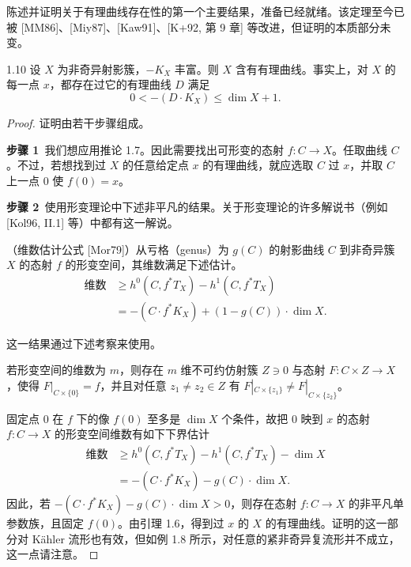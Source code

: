 陈述并证明关于有理曲线存在性的第一个主要结果，准备已经就绪。该定理至今已被 [MM86]、[Miy87]、[Kaw91]、[K+92, 第 9 章] 等改进，但证明的本质部分未变。

\begin{theoremp}[{[Mor79]}]{1.10}
设 $X$ 为非奇异射影簇，$-K_X$ 丰富。则 $X$ 含有有理曲线。事实上，对 $X$ 的每一点 $x$，都存在过它的有理曲线 $D$ 满足
\[ 0<-(D\cdot K_X)\le\dim X+1. \]
\end{theoremp}

\begin{proof}
证明由若干步骤组成。

\textbf{步骤 1}\ 我们想应用推论 1.7。因此需要找出可形变的态射 $f: C\to X$。任取曲线 $C$。不过，若想找到过 $X$ 的任意给定点 $x$ 的有理曲线，就应选取 $C$ 过 $x$，并取 $C$ 上一点 $0$ 使 $f(0)=x$。

\textbf{步骤 2}\ 使用形变理论中下述非平凡的结果。关于形变理论的许多解说书（例如 [Kol96, II.1] 等）中都有这一解说。

（维数估计公式 [Mor79]）从亏格（genus）为 $g(C)$ 的射影曲线 $C$ 到非奇异簇 $X$ 的态射 $f$ 的形变空间，其维数满足下述估计。
\begin{equation*}
\begin{aligned}
\text{维数}&\ge h^0(C,f^*T_X)-h^1(C,f^*T_X)\\
&=-(C\cdot f^*K_X)+(1-g(C))\cdot\dim X.
\end{aligned}
\end{equation*}

这一结果通过下述考察来使用。

若形变空间的维数为 $m$，则存在 $m$ 维不可约仿射簇 $Z\ni 0$ 与态射 $F: C\times Z\to X$，使得 $F|_{C\times\{0\}}=f$，并且对任意 $z_1\ne z_2\in Z$ 有 $F|_{C\times\{z_1\}}\ne F|_{C\times\{z_2\}}$。

固定点 $0$ 在 $f$ 下的像 $f(0)$ 至多是 $\dim X$ 个条件，故把 $0$ 映到 $x$ 的态射 $f: C\to X$ 的形变空间维数有如下下界估计
\begin{equation*}
\begin{aligned}
\text{维数}&\ge h^0(C,f^*T_X)-h^1(C,f^*T_X)-\dim X\\
&=-(C\cdot f^*K_X)-g(C)\cdot\dim X.
\end{aligned}
\end{equation*}
因此，若 $-(C\cdot f^*K_X)-g(C)\cdot\dim X>0$，则存在态射 $f: C\to X$ 的非平凡单参数族，且固定 $f(0)$。由引理 1.6，得到过 $x$ 的 $X$ 的有理曲线。证明的这一部分对 Kähler 流形也有效，但如例 1.8 所示，对任意的紧非奇异复流形并不成立，这一点请注意。


\end{proof}
